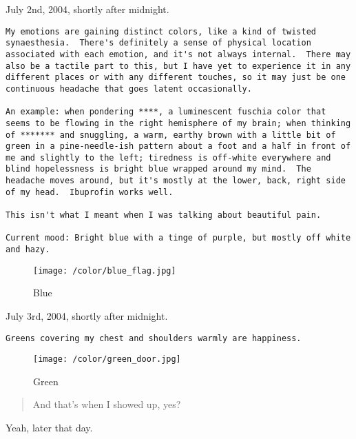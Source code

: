 July 2nd, 2004, shortly after midnight.

\begin{verbatim}
My emotions are gaining distinct colors, like a kind of twisted synaesthesia.  There's definitely a sense of physical location associated with each emotion, and it's not always internal.  There may also be a tactile part to this, but I have yet to experience it in any different places or with any different touches, so it may just be one continuous headache that goes latent occasionally.  

An example: when pondering ****, a luminescent fuschia color that seems to be flowing in the right hemisphere of my brain; when thinking of ******* and snuggling, a warm, earthy brown with a little bit of green in a pine-needle-ish pattern about a foot and a half in front of me and slightly to the left; tiredness is off-white everywhere and blind hopelessness is bright blue wrapped around my mind.  The headache moves around, but it's mostly at the lower, back, right side of my head.  Ibuprofin works well.

This isn't what I meant when I was talking about beautiful pain.

Current mood: Bright blue with a tinge of purple, but mostly off white and hazy.
\end{verbatim}

\begin{figure}
\centering
\texttt{[image: /color/blue\_flag.jpg]}
\caption{Blue}
\end{figure}

July 3rd, 2004, shortly after midnight.

\begin{verbatim}
Greens covering my chest and shoulders warmly are happiness.
\end{verbatim}

\begin{figure}
\centering
\texttt{[image: /color/green\_door.jpg]}
\caption{Green}
\end{figure}

\begin{quote}
And that's when I showed up, yes?
\end{quote}

Yeah, later that day.

